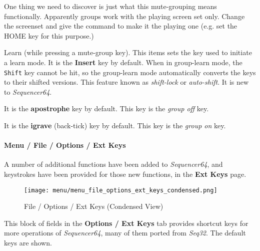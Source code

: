    One thing we need to discover is just what this mute-grouping
   means functionally.
   Apparently groups work with the playing screen set only.
   Change the screenset and give the command to make it the playing one
   (e.g. set the HOME key for this purpose.)

   Learn (while pressing a mute-group key).
   This items sets the key used to initiate a learn mode.
   It is the \textbf{Insert} key by default.
   When in group-learn mode, the \texttt{Shift} key cannot be hit, so the
   group-learn mode automatically converts the keys to their shifted versions.
   This feature known as \textsl{shift-lock} or \textsl{auto-shift}.
   It is new to \textsl{Sequencer64}.

   It is the \textbf{apostrophe} key by default.
   This key is the \textsl{group off} key.

   It is the \textbf{igrave} (back-tick) key by default.
   This key is the \textsl{group on} key.

\paragraph{Menu / File / Options / Ext Keys }
\label{paragraph:seq64_menu_file_options_ext_keys}

   A number of additional functions have been added to \textsl{Sequencer64},
   and keystrokes have been provided for those new functions, in the
   \textbf{Ext Keys} page.

\begin{figure}[H]
   \centering 
   \texttt{[image: menu/menu\_file\_options\_ext\_keys\_condensed.png]}
   \caption{File / Options / Ext Keys (Condensed View)}
   \label{fig:seq64_menu_file_options_ext_keys}
\end{figure}


   This block of fields in the \textbf{Options / Ext Keys} tab
   provides shortcut keys for more operations of \textsl{Sequencer64}, many of
   them ported from \textsl{Seq32}.
   The default keys are shown.

